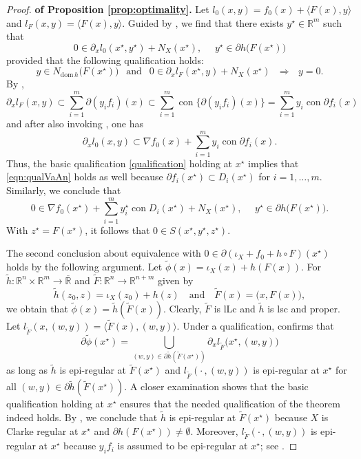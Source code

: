 \documentclass[smallextended,envcountsect]{svjour3}
\newcommand{\dom}[1]{\mathrm{dom}\, #1} %
\newcommand{\ind}{\iota}%
\newcommand{\reals}{\mathbb{R}}
\newcommand{\Reals}{\overline{\mathbb{R}}}
\DeclareMathOperator{\con}{con}
\begin{document}
\begin{proof} {\bf of Proposition \ref{prop:optimality}.} Let $l_0(x,y) = f_0(x) + \langle F(x), y\rangle$ and $l_F(x,y) = \langle F(x), y\rangle$. Guided by \cite[Exercise 10.52]{Rockafellar_Wets_1998}, we find that there exists $y^\star\in\reals^m$ such that 
\[
0 \in \partial_x l_0(x^\star,y^\star) + N_X(x^\star), ~~~~~~y^\star \in \partial h\big(F(x^\star)\big)
\]
provided that the following qualification holds: 
\begin{equation}\label{eqn:qualVaAn}
y\in N_{\dom h}\big(F(x^\star)\big) ~~ \mbox{ and }~ ~  0 \in \partial_x l_F(x^\star,y) + N_X(x^\star)~~~\Longrightarrow~~~ y=0.
\end{equation}
By \cite[Corollary 10.9, Theorem 9.61]{Rockafellar_Wets_1998}, 
\[
\partial_x l_F(x, y) \subset \sum_{i=1}^m \partial (y_i f_i)(x) \subset \sum_{i=1}^m \con \big\{\partial (y_i f_i)(x)\big\} = \sum_{i=1}^m y_i \con \partial f_i(x)
\]
and after also invoking \cite[Proposition 4.58(c)]{Royset_Wets_2021}, one has
\[
\partial_x l_0(x, y) \subset \nabla f_0(x) + \sum_{i=1}^m y_i \con \partial f_i(x).
\]
Thus, the basic qualification \eqref{qualification} holding at $x^\star$ implies that \eqref{eqn:qualVaAn} holds as well because $\partial f_i(x^\star) \subset D_i(x^\star)$ for $i = 1, \dots, m$. Similarly, we conclude that  
\[
0 \in \nabla f_0(x^\star) + \sum_{i=1}^m y_i^\star \con D_i(x^\star) + N_X(x^\star), ~~~~~~y^\star \in \partial h\big(F(x^\star)\big).
\]
With $z^\star = F(x^\star)$, it follows that $0 \in S(x^\star, y^\star, z^\star)$. 

The second conclusion about equivalence with $0\in \partial(\iota_X + f_0 + h \circ F)(x^\star)$ holds by the following argument. Let $\tilde \phi(x) = \iota_X(x) + h(F(x))$. For $\tilde h:\reals^n\times\reals^m\to \Reals$ and $\tilde F:\reals^n\to \reals^{n+m}$ given by
\[
\tilde h(z_0,z) = \ind_X(z_0) + h(z)~~~\mbox{ and } ~~~ \tilde F(x) = \big(x, F(x)\big), 
\]
we obtain that $\tilde\phi(x) = \tilde h(\tilde F(x))$. Clearly, $\tilde F$ is lLc and $\tilde h$ is lsc and proper. Let $l_{\tilde F}(x,(w,y)) = \langle \tilde F(x), (w,y)\rangle$.  Under a qualification, \cite[Theorem 6.23]{Royset_Wets_2021} confirms that
\[
\partial \tilde\phi(x^\star) = \bigcup_{(w,y)\in \partial \tilde h(\tilde F(x^\star))} \partial_x l_{\tilde F}\big(x^\star,(w,y)\big)
\]
as long as $\tilde h$ is epi-regular at $\tilde F(x^\star)$ and $l_{\tilde F}(\cdot\,,(w,y))$ is epi-regular at $x^\star$ for all $(w,y) \in \partial \tilde h(\tilde F(x^\star))$. A closer examination shows that the basic qualification holding at $x^\star$ ensures that the needed qualification of the theorem indeed holds. By \cite[Proposition 4.63]{Royset_Wets_2021}, we conclude that $\tilde h$ is epi-regular at $\tilde F(x^\star)$ because $X$ is Clarke regular at $x^\star$ and $\partial h(F(x^\star)) \neq \emptyset$. Moreover, $l_{\tilde F}(\cdot\,,(w,y))$ is epi-regular at $x^\star$ because $y_i f_i$ is assumed to be epi-regular at $x^\star$; see \cite[Example 4.70]{Royset_Wets_2021}. 


\end{proof}
\end{document}
